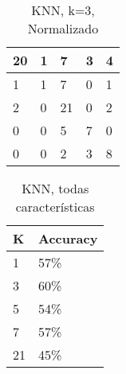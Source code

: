 \documentclass[12pt]{article}
\begin{document}
\begin{table}[H]

\centering
\caption{KNN, k=3, Normalizado}
\label{my-label}
\begin{tabular}{|l|l|l|l|l|}
\hline
20 & 1 & 7  & 3 & 4 \\ \hline
1  & 1 & 7  & 0 & 1 \\ \hline
2  & 0 & 21 & 0 & 2 \\ \hline
0  & 0 & 5  & 7 & 0 \\ \hline
0  & 0 & 2  & 3 & 8 \\ \hline
\end{tabular}
\end{table}

	

\begin{table}[H]
\centering
\caption{KNN, todas características}
\label{my-label}
\begin{tabular}{|l|l|}
\hline
K  & Accuracy \\ \hline
1  & 57\%     \\ \hline
3  & 60\%     \\ \hline
5  & 54\%     \\ \hline
7  & 57\%     \\ \hline
21 & 45\%     \\ \hline
\end{tabular}
\end{table}
\end{document}
